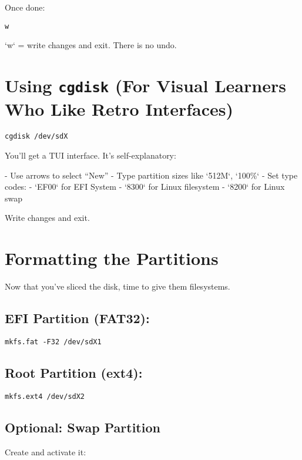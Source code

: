 \documentclass[12pt]{book}
\begin{document}
Once done:

\begin{lstlisting}
w
\end{lstlisting}

`w` = write changes and exit. There is no undo.

\section{Using \texttt{cgdisk} (For Visual Learners Who Like Retro Interfaces)}

\begin{lstlisting}
cgdisk /dev/sdX
\end{lstlisting}

You’ll get a TUI interface. It’s self-explanatory:

- Use arrows to select “New”
- Type partition sizes like `512M`, `100\%`
- Set type codes:
  - `EF00` for EFI System
  - `8300` for Linux filesystem
  - `8200` for Linux swap

Write changes and exit.

\section{Formatting the Partitions}

Now that you’ve sliced the disk, time to give them filesystems.

\subsection*{EFI Partition (FAT32):}

\begin{lstlisting}
mkfs.fat -F32 /dev/sdX1
\end{lstlisting}

\subsection*{Root Partition (ext4):}

\begin{lstlisting}
mkfs.ext4 /dev/sdX2
\end{lstlisting}

\subsection*{Optional: Swap Partition}

Create and activate it:
\end{document}
